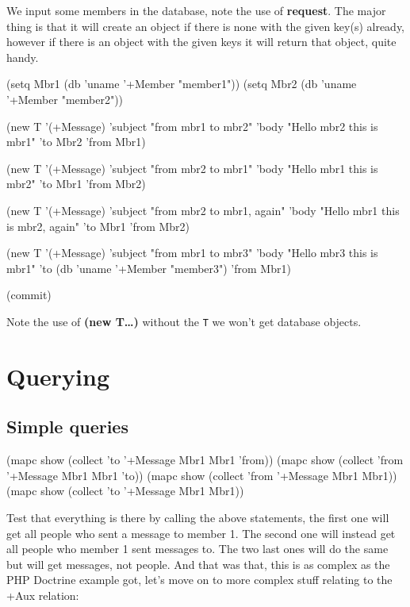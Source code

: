 We input some members in the database, note the use of \textbf{request}. The
major thing is that it will create an object if there is none with the
given key(s) already, however if there is an object with the given keys
it will return that object, quite handy.


\begin{wideverbatim}
(setq Mbr1 (db 'uname '+Member "member1"))
(setq Mbr2 (db 'uname '+Member "member2"))

(new T '(+Message) 
  'subject "from mbr1 to mbr2"
  'body "Hello mbr2 this is mbr1"
  'to Mbr2
  'from Mbr1)
  
(new T '(+Message) 
  'subject "from mbr2 to mbr1"
  'body "Hello mbr1 this is mbr2"
  'to Mbr1
  'from Mbr2)
  
(new T '(+Message) 
  'subject "from mbr2 to mbr1, again"
  'body "Hello mbr1 this is mbr2, again"
  'to Mbr1
  'from Mbr2)
  
\end{wideverbatim}

\begin{wideverbatim}

(new T '(+Message) 
  'subject "from mbr1 to mbr3"
  'body "Hello mbr3 this is mbr1"
  'to (db 'uname '+Member "member3")
  'from Mbr1)
  
(commit)
\end{wideverbatim}

Note the use of \textbf{(new T\dots{})} without the \texttt{T} we won't
get database objects.


\section{Querying}
\label{sec:pilog-solve-querying}

\subsection{Simple queries}
\label{sec:pilog-solve-simple-queries}

\begin{wideverbatim}
(mapc show (collect 'to '+Message Mbr1 Mbr1 'from))
(mapc show (collect 'from '+Message Mbr1 Mbr1 'to))
(mapc show (collect 'from '+Message Mbr1 Mbr1))
(mapc show (collect 'to '+Message Mbr1 Mbr1))
\end{wideverbatim}

Test that everything is there by calling the above statements, the first
one will get all people who sent a message to member 1. The second one
will instead get all people who member 1 sent messages to. The two last
ones will do the same but will get messages, not people. And that was
that, this is as complex as the PHP Doctrine example got, let's move on
to more complex stuff relating to the +Aux relation:

